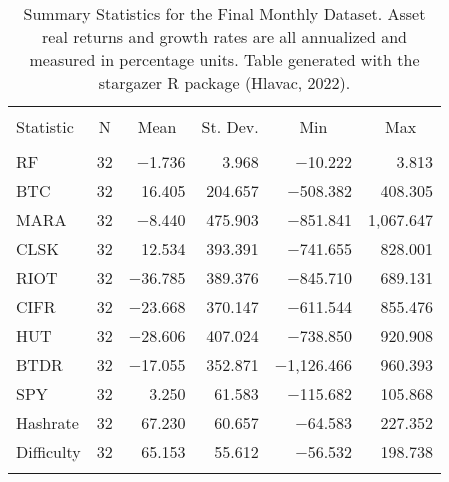 
\begin{table}[!htbp] \centering 
  \caption{Summary Statistics for the Final Monthly Dataset. Asset real returns and growth rates are all annualized and measured in percentage units. Table generated with the stargazer R package (Hlavac, 2022).} 
  \label{SummaryStats_real} 
\large 
\begin{tabular}{@{\extracolsep{5pt}}lrrrrr} 
\\[-1.8ex]\hline 
\hline \\[-1.8ex] 
Statistic & \multicolumn{1}{c}{N} & \multicolumn{1}{c}{Mean} & \multicolumn{1}{c}{St. Dev.} & \multicolumn{1}{c}{Min} & \multicolumn{1}{c}{Max} \\ 
\hline \\[-1.8ex] 
RF & 32 & $-$1.736 & 3.968 & $-$10.222 & 3.813 \\ 
BTC & 32 & 16.405 & 204.657 & $-$508.382 & 408.305 \\ 
MARA & 32 & $-$8.440 & 475.903 & $-$851.841 & 1,067.647 \\ 
CLSK & 32 & 12.534 & 393.391 & $-$741.655 & 828.001 \\ 
RIOT & 32 & $-$36.785 & 389.376 & $-$845.710 & 689.131 \\ 
CIFR & 32 & $-$23.668 & 370.147 & $-$611.544 & 855.476 \\ 
HUT & 32 & $-$28.606 & 407.024 & $-$738.850 & 920.908 \\ 
BTDR & 32 & $-$17.055 & 352.871 & $-$1,126.466 & 960.393 \\ 
SPY & 32 & 3.250 & 61.583 & $-$115.682 & 105.868 \\ 
Hashrate & 32 & 67.230 & 60.657 & $-$64.583 & 227.352 \\ 
Difficulty & 32 & 65.153 & 55.612 & $-$56.532 & 198.738 \\ 
\hline \\[-1.8ex] 
\end{tabular} 
\end{table} 
